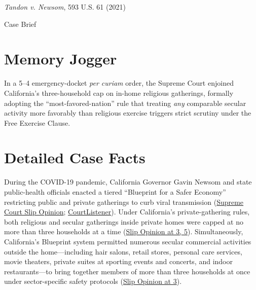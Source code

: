 \documentclass[12pt]{article}
\begin{document}
\begin{center}
{\LARGE \textit{Tandon v. Newsom}, 593 U.S. 61 (2021)\par}
\vspace{0.8em}
{\large Case Brief\par}
\end{center}
\vspace{1em}

\section{Memory Jogger}
In a 5--4 emergency-docket \textit{per curiam} order, the Supreme Court enjoined California's three-household cap on in-home religious gatherings, formally adopting the ``most-favored-nation'' rule that treating \textit{any} comparable secular activity more favorably than religious exercise triggers strict scrutiny under the Free Exercise Clause.

\section{Detailed Case Facts}
During the COVID-19 pandemic, California Governor Gavin Newsom and state public-health officials enacted a tiered ``Blueprint for a Safer Economy'' restricting public and private gatherings to curb viral transmission (\href{https://www.supremecourt.gov/opinions/20pdf/20a151_4g15.pdf}{Supreme Court Slip Opinion}; \href{https://www.courtlistener.com/opinion/4872486/tandon-v-newsom/}{CourtListener}). Under California's private-gathering rules, both religious and secular gatherings inside private homes were capped at no more than three households at a time (\href{https://www.supremecourt.gov/opinions/20pdf/20a151_4g15.pdf}{Slip Opinion at 3, 5}). Simultaneously, California's Blueprint system permitted numerous secular commercial activities outside the home---including hair salons, retail stores, personal care services, movie theaters, private suites at sporting events and concerts, and indoor restaurants---to bring together members of more than three households at once under sector-specific safety protocols (\href{https://www.supremecourt.gov/opinions/20pdf/20a151_4g15.pdf}{Slip Opinion at 3}).
\end{document}

